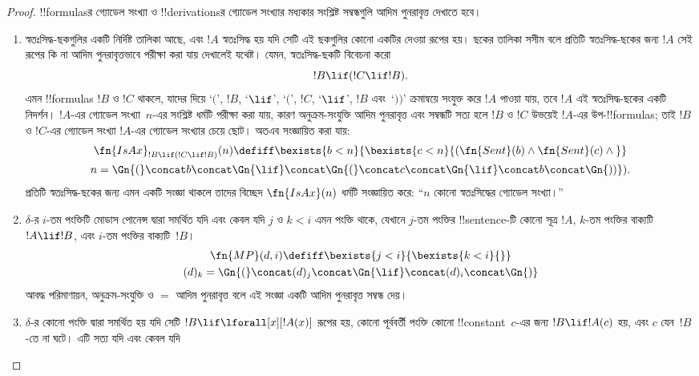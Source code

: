 \documentclass[../../../include/open-logic-section]{subfiles}
\begin{document}
\begin{proof}
!!{formula}sর গ্যোডেল সংখ্যা ও !!{derivation}sর গ্যোডেল সংখ্যার মধ্যকার
সংশ্লিষ্ট সম্বন্ধগুলি আদিম পুনরাবৃত্ত দেখাতে হবে।
\begin{enumerate}
\item স্বতঃসিদ্ধ-ছকগুলির একটি নির্দিষ্ট তালিকা আছে, এবং $!A$ স্বতঃসিদ্ধ হয়
  যদি সেটি এই ছকগুলির কোনো একটির দেওয়া রূপের হয়। ছকের তালিকা সসীম বলে
  প্রতিটি স্বতঃসিদ্ধ-ছকের জন্য $!A$ সেই রূপের কি না আদিম পুনরাবৃত্তভাবে
  পরীক্ষা করা যায় দেখালেই যথেষ্ট। যেমন, স্বতঃসিদ্ধ-ছকটি বিবেচনা করো
  \[
  !B \lif (!C \lif !B).
  \]
  এমন !!{formula}s $!B$ ও $!C$ থাকলে, যাদের দিয়ে `$($', $!B$, `$\lif$',
  `$($', $!C$, `$\lif$', $!B$ এবং~`$))$' ক্রমান্বয়ে সংযুক্ত করে $!A$ পাওয়া
  যায়, তবে $!A$ এই স্বতঃসিদ্ধ-ছকের একটি নিদর্শন। $!A$-এর গ্যোডেল
  সংখ্যা~$n$-এর সংশ্লিষ্ট ধর্মটি পরীক্ষা করা যায়, কারণ অনুক্রম-সংযুক্তি
  আদিম পুনরাবৃত্ত এবং সম্বন্ধটি সত্য হলে $!B$ ও $!C$ উভয়েই $!A$-এর
  উপ-!!{formula}s; তাই $!B$ ও $!C$-এর গ্যোডেল সংখ্যা $!A$-এর গ্যোডেল সংখ্যার চেয়ে
  ছোট। অতএব সংজ্ঞায়িত করা যায়:
  \begin{multline*}
  \fn{IsAx}_{!B \lif (!C \lif !B)}(n) \defiff \bexists{b< n}{
    \bexists{c < n}{(\fn{Sent}(b) \land \fn{Sent}(c) \land {}}}\\ n =
  \Gn{(} \concat b \concat \Gn{\lif} \concat \Gn{(} \concat c \concat
  \Gn{\lif} \concat b \concat \Gn{))}).
  \end{multline*}
  প্রতিটি স্বতঃসিদ্ধ-ছকের জন্য এমন একটি সংজ্ঞা থাকলে তাদের বিচ্ছেদ
  $\fn{IsAx}(n)$ ধর্মটি সংজ্ঞায়িত করে: ``$n$ কোনো স্বতঃসিদ্ধের গ্যোডেল
  সংখ্যা।''
\item $\delta$-র $i$-তম পংক্তিটি মোডাস পোনেন্স দ্বারা সমর্থিত যদি এবং কেবল
  যদি $j$ ও $k<i$ এমন পংক্তি থাকে, যেখানে $j$-তম পংক্তির !!{sentence}-টি
  কোনো সূত্র $!A$, $k$-তম পংক্তির বাক্যটি $!A \lif !B$, এবং $i$-তম
  পংক্তির বাক্যটি~$!B$।
  \begin{multline*}
    \fn{MP}(d, i) \defiff \bexists{j < i}{\bexists{k < i}{}}\\
    (d)_k = \Gn{(} \concat (d)_j
      \concat \Gn{\lif} \concat (d)_i \concat \Gn{)}
  \end{multline*}
  আবদ্ধ পরিমাণায়ন, অনুক্রম-সংযুক্তি ও $=$ আদিম পুনরাবৃত্ত বলে এই সংজ্ঞা
  একটি আদিম পুনরাবৃত্ত সম্বন্ধ দেয়।
\item $\delta$-র কোনো পংক্তি \QR{} দ্বারা সমর্থিত হয় যদি সেটি
  $!B \lif \lforall[x][!A(x)]$ রূপের হয়, কোনো পূর্ববর্তী পংক্তি কোনো
  !!{constant}~$c$-এর জন্য $!B \lif !A(c)$ হয়, এবং $c$ যেন~$!B$-তে না
  ঘটে। এটি সত্য যদি এবং কেবল যদি
  \begin{enumerate}

\end{enumerate}
\end{enumerate}
\end{proof}
\end{document}
